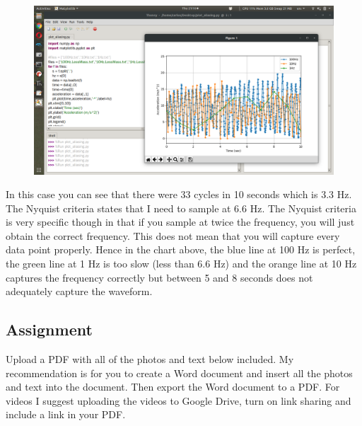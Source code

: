 \begin{figure}[H]
  \begin{center}
    \includegraphics[width=\textwidth]{Figures/aliasing2.png}
  \end{center}
\end{figure}
In this case you can see that there were 33 cycles in 10 seconds which is 3.3 Hz. The Nyquist criteria states that I need to sample at 6.6 Hz. The Nyquist criteria is very specific though in that if you sample at twice the frequency, you will just obtain the correct frequency. This does not mean that you will capture every data point properly. Hence in the chart above, the blue line at 100 Hz is perfect, the green line at 1 Hz is too slow (less than 6.6 Hz) and the orange line at 10 Hz captures the frequency correctly but between 5 and 8 seconds does not adequately capture the waveform.

\subsection{Assignment}

Upload a PDF with all of the photos and text below included. My recommendation is for you to create a Word document and insert all the photos and text into the document. Then export the Word document to a PDF. For videos I suggest uploading the videos to Google Drive, turn on link sharing and include a link in your PDF.

